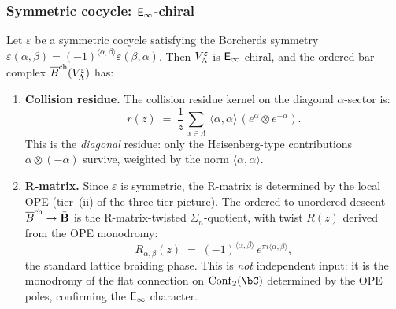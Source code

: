 \subsubsection{Symmetric cocycle: \texorpdfstring{$\mathsf{E}_{\infty}$}{E-infinity}-chiral}

\begin{theorem}
\label{thm:lattice-symmetric-ordered-bar}
Let $\varepsilon$ be a symmetric cocycle satisfying the Borcherds
symmetry $\varepsilon(\alpha,\beta) = (-1)^{\langle\alpha,\beta\rangle}
\varepsilon(\beta,\alpha)$. Then $V_\Lambda^\varepsilon$ is
$\mathsf{E}_{\infty}$-chiral, and the ordered bar complex
$\overline{B}^{\mathrm{ch}}(V_\Lambda^\varepsilon)$ has:

\begin{enumerate}[label=\textup{(\arabic*)}]
\item \textbf{Collision residue.}
The collision residue kernel on the diagonal $\alpha$-sector is:
\begin{equation}\label{eq:lattice-symmetric-residue}
r(z) \;=\; \frac{1}{z}\sum_{\alpha \in \Lambda}\,
 \langle\alpha,\alpha\rangle\,
 (e^\alpha \otimes e^{-\alpha}).
\end{equation}
This is the \emph{diagonal} residue: only the Heisenberg-type
contributions $\alpha \otimes (-\alpha)$ survive, weighted by the norm
$\langle\alpha,\alpha\rangle$.

\item \textbf{R-matrix.}
Since $\varepsilon$ is symmetric, the R-matrix is
determined by the local OPE \textup{(}tier~(ii) of the three-tier
picture\textup{)}.
The ordered-to-unordered descent
$\overline{B}^{\mathrm{ch}} \to \bar{\mathbf{B}}$
is the R-matrix-twisted $\Sigma_n$-quotient, with twist
$R(z)$ derived from the OPE monodromy:
\begin{equation}\label{eq:lattice-symmetric-rmatrix}
R_{\alpha,\beta}(z) \;=\;
 (-1)^{\langle\alpha,\beta\rangle}\,
 e^{\pi i\langle\alpha,\beta\rangle},
\end{equation}
the standard lattice braiding phase. This is \emph{not} independent
input: it is the monodromy of the flat connection on
$\operatorname{Conf}_2(\bC)$ determined by the OPE poles,
confirming the $\mathsf{E}_{\infty}$ character.
\end{enumerate}
\end{theorem}

